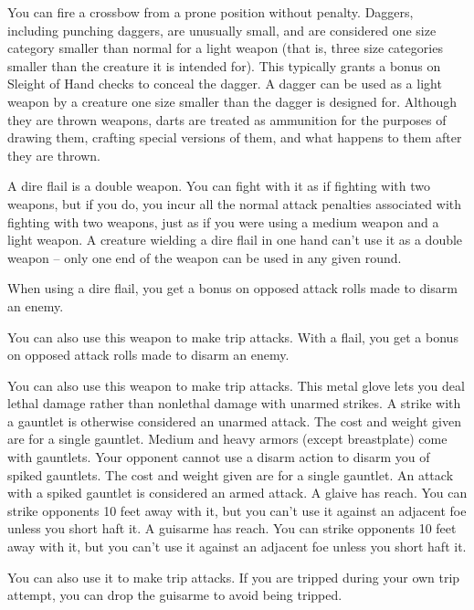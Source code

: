 \par You can fire a crossbow from a prone position without penalty.
 Daggers, including punching daggers, are unusually small, and are considered one size category smaller than normal for a light weapon (that is, three size categories smaller than the creature it is intended for). This typically grants a  bonus on Sleight of Hand checks to conceal the dagger. A dagger can be used as a light weapon by a creature one size smaller than the dagger is designed for.
 Although they are thrown weapons, darts are treated as ammunition for the purposes of drawing them, crafting special versions of them, and what happens to them after they are thrown.

 A dire flail is a double weapon. You can fight with it as if fighting with two weapons, but if you do, you incur all the normal attack penalties associated with fighting with two weapons, just as if you were using a medium weapon and a light weapon. A creature wielding a dire flail in one hand can't use it as a double weapon -- only one end of the weapon can be used in any given round.
\par When using a dire flail, you get a  bonus on opposed attack rolls made to disarm an enemy.
\par You can also use this weapon to make trip attacks.
 With a flail, you get a  bonus on opposed attack rolls made to disarm an enemy.
\par You can also use this weapon to make trip attacks.
 This metal glove lets you deal lethal damage rather than nonlethal damage with unarmed strikes. A strike with a gauntlet is otherwise considered an unarmed attack. The cost and weight given are for a single gauntlet. Medium and heavy armors (except breastplate) come with gauntlets.
 Your opponent cannot use a disarm action to disarm you of spiked gauntlets. The cost and weight given are for a single gauntlet. An attack with a spiked gauntlet is considered an armed attack.
 A glaive has reach. You can strike opponents 10 feet away with it, but you can't use it against an adjacent foe unless you short haft it.
 A guisarme has reach. You can strike opponents 10 feet away with it, but you can't use it against an adjacent foe unless you short haft it.
\par You can also use it to make trip attacks. If you are tripped during your own trip attempt, you can drop the guisarme to avoid being tripped.
